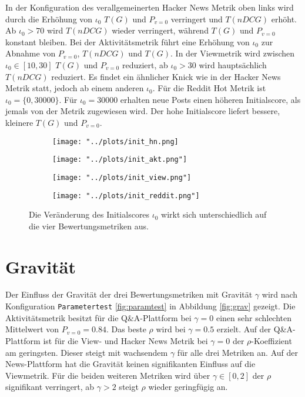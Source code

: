 In der Konfiguration des verallgemeinerten Hacker News Metrik oben links wird durch die Erhöhung von $\iota_0$ $T(G)$ und $P_{v=0}$ verringert und $T(nDCG)$ erhöht. Ab $\iota_0 > 70$ wird $T(nDCG)$ wieder verringert, während $T(G)$ und $P_{v=0}$ konstant bleiben. Bei der Aktivitätsmetrik führt eine Erhöhung von $\iota_0$ zur Abnahme von $P_{v=0}$, $T(nDCG)$ und $T(G)$. In der Viewmetrik wird zwischen $\iota_0 \in [10,30]$ $T(G)$ und $P_{v=0}$ reduziert, ab $\iota_0 > 30$ wird hauptsächlich $T(nDCG)$ reduziert. Es findet ein ähnlicher Knick wie in der Hacker News Metrik statt, jedoch ab einem anderen $\iota_0$. Für die Reddit Hot Metrik ist $\iota_0 = \{0,30000\}$. Für $\iota_0 = 30000$ erhalten neue Posts einen höheren Initialscore, als jemals von der Metrik zugewiesen wird. Der hohe Initialscore liefert bessere, kleinere $T(G)$ und $P_{v=0}$. 

\begin{figure}[!htb]
	\begin{subfigure}{0.5\textwidth}
		\texttt{[image: "../plots/init\_hn.png]}%
		\label{init_hn}
	\end{subfigure}
	\hfill
	\begin{subfigure}{0.5\textwidth}
		\texttt{[image: "../plots/init\_akt.png"]}%
		\label{init_akt}
	\end{subfigure}
	\begin{subfigure}{0.5\textwidth}
		\texttt{[image: "../plots/init\_view.png"]}%
		\label{init_view}
	\end{subfigure}
	\hfill
	\begin{subfigure}{0.5\textwidth}
		\texttt{[image: "../plots/init\_reddit.png"]}%
		\label{init_reddit}
	\end{subfigure}
	\caption{Die Veränderung des Initialscores $\iota_0$ wirkt sich unterschiedlich auf die vier Bewertungsmetriken aus.}
	\label{fig:init_rating_metrics}
\end{figure}


\section{Gravität}

Der Einfluss der Gravität der drei Bewertungsmetriken mit Gravität $\gamma$ wird nach Konfiguration \texttt{Parametertest} \ref{fig:paramtest} in Abbildung \ref{fig:grav} gezeigt. Die Aktivitätsmetrik besitzt für die Q\&A-Plattform bei $\gamma = 0$ einen sehr schlechten Mittelwert von $P_{v=0} = 0.84$. Das beste $\rho$ wird bei $\gamma = 0.5$ erzielt. Auf der Q\&A-Plattform ist für die View- und Hacker News Metrik bei $\gamma = 0$ der $\rho$-Koeffizient am geringsten. Dieser steigt mit wachsendem $\gamma$ für alle drei Metriken an. Auf der News-Plattform hat die Gravität keinen signifikanten Einfluss auf die Viewmetrik. Für die beiden weiteren Metriken wird über $\gamma \in [0,2]$ der $\rho$ signifikant verringert, ab $\gamma > 2$ steigt $\rho$ wieder geringfügig an. 

